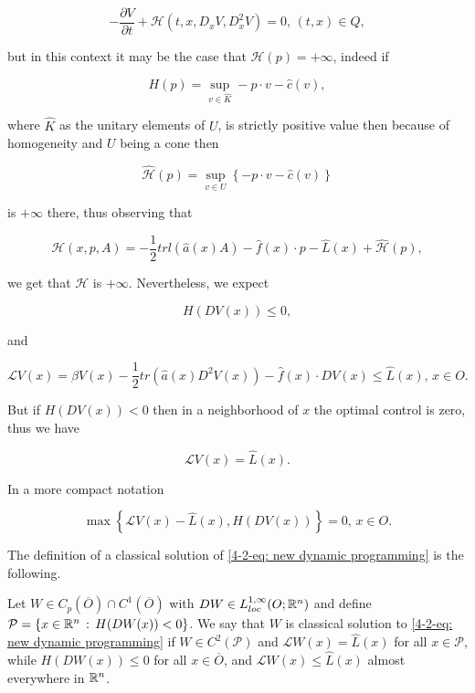 \[-\frac{\partial V}{\partial t} + \mathcal{H}(t,x,D_x V,D_x^2 V)=0,\,(t,x)\in Q,\]

but in this context it may be the case that $\mathcal{H}(p)=+\infty$, indeed if 

\begin{equation}
    H(p) = \sup_{v\in\hat{K}}-p\cdot v-\hat{c}(v),
\end{equation}

where $\hat{K}$ as the unitary elements of $U$, is strictly positive value then because of homogeneity and $U$ being a cone then

\begin{equation}
    \hat{\mathcal{H}}(p)=\sup_{v\in U}\left\{-p\cdot v - \hat{c}(v)\right\}
\end{equation}

is $+\infty$ there, thus observing that

\[\mathcal{H}(x,p,A) = -\frac{1}{2}trl\left(\hat{a}(x)A\right) - \hat{f}(x)\cdot p - \hat{L}(x) + \hat{\mathcal{H}}(p),\]

we get that $\mathcal{H}$ is $+\infty$. Nevertheless, we expect

\begin{equation}
    H(DV(x)) \leq 0,
\end{equation}

and 

\begin{equation}
    \mathcal{L}V(x) = \beta V(x) - \frac{1}{2}tr\left(\hat{a}(x)D^2V(x)\right) - \hat{f}(x)\cdot DV(x)\leq \hat{L}(x), \, x\in O.
\end{equation}

But if $H(DV(x))<0$ then in a neighborhood of $x$ the optimal control is zero, thus we have

\[\mathcal{L}V(x)=\hat{L}(x).\]

In a more compact notation

\begin{equation}\label{4-2-eq: new dynamic programming}
    \max\left\{\mathcal{L}V(x)-\hat{L}(x),H(DV(x))\right\} = 0,\, x\in O.
\end{equation}

The definition of a classical solution of \eqref{4-2-eq: new dynamic programming} is the following.

\begin{definition}
    Let $W\in C_p(\overline{O})\cap C^1(\overline{O})$ with $DW\in L_{loc}^{1,\infty}(O;\mathbb{R}^n)$ and define $\mathcal{P}=\left\{x\in\mathbb{R}^n\,:\,H(DW(x))<0\right\}$. We say that $W$ is classical solution to \eqref{4-2-eq: new dynamic programming} if $W\in C^2(\mathcal{P})$ and $\mathcal{L}W(x)=\hat{L}(x)$ for all $x\in\mathcal{P}$, while $H(DW(x))\leq 0$ for all $x\in\overline{O}$, and $\mathcal{L}W(x)\leq \hat{L}(x)$ almost everywhere in $\mathbb{R}^n$.  
\end{definition}